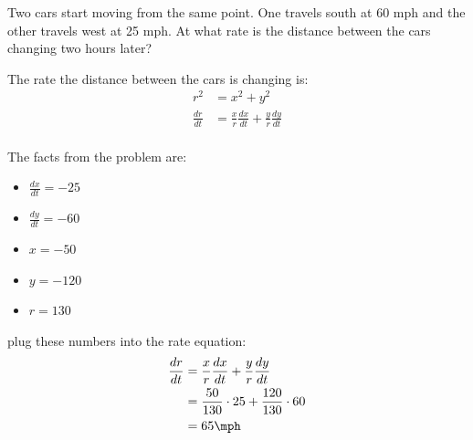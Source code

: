 \documentclass[fleqn,addpoints]{exam}
\begin{document}
\begin{questions}

\question
Two cars start moving from the same point.  One travels south at 60 mph and the other travels west at 25 mph.  At what
rate is the distance between the cars changing two hours later?

\begin{solution}
The rate the distance between the cars is changing is:
\begin{align*}
  r^2 &= x^2 + y^2 \\
  \frac{dr}{dt} &= \frac{x}{r} \frac{dx}{dt} + \frac{y}{r} \frac{dy}{dt} \\
\end{align*}

The facts from the problem are:
\begin{itemize}
  \item $\frac{dx}{dt} = -25$
  \item $\frac{dy}{dt} = -60$
  \item $x = -50$ 
  \item $y = -120$ 
  \item $r = 130$
\end{itemize}

plug these numbers into the rate equation:
\begin{align*}
  \frac{dr}{dt} &= \frac{x}{r} \frac{dx}{dt} + \frac{y}{r} \frac{dy}{dt} \\
    &= \frac{50}{130} \cdot 25 + \frac{120}{130} \cdot 60 \\
    &= 65 \mph \\
\end{align*}


\end{solution}
\end{questions}
\end{document}
